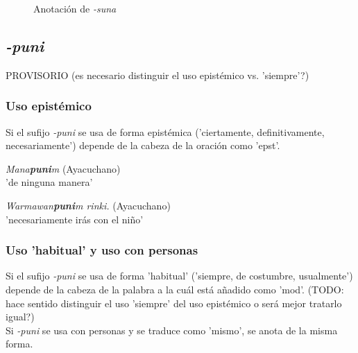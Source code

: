 \documentclass[a4paper,11pt,DIV12]{scrartcl}
\begin{document}
\begin{figure}
 \begin{center}
\caption{Anotaci\'on de {\em -suna}}\label{Fig:suna}
 \end{center}
\end{figure}

  \subsection{{\em-puni}}
PROVISORIO (es necesario distinguir el uso epist\'emico vs. 'siempre'?)
  \subsubsection{Uso epist\'emico}
Si el sufijo {\em -puni} se usa de forma epist\'emica ('ciertamente, definitivamente, necesariamente') depende de la cabeza de la oraci\'on como 'epst'.

\begin{examples}
 \item {\em Mana\textbf{puni}m} (Ayacuchano)\\
      'de ninguna manera'
 \item {\em Warmawan\textbf{puni}m rinki.} (Ayacuchano)\\
      'necesariamente ir\'as con el ni\~no'\\
    		\hfill{\small \citep[128]{Soto76a}}
\end{examples}

\subsubsection{Uso 'habitual' y uso con personas}
Si el sufijo {\em -puni} se usa de forma 'habitual' ('siempre, de costumbre, usualmente') depende de la cabeza de la palabra a la cu\'al est\'a a\~nadido como 'mod'. (TODO: hace sentido distinguir el uso 'siempre' del uso epist\'emico o ser\'a mejor tratarlo igual?)\\
Si {\em -puni} se usa con personas y se traduce como 'mismo', se anota de la misma forma.
\end{document}
